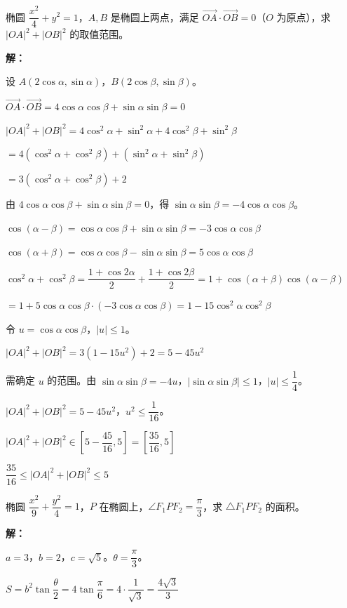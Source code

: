 \documentclass[12pt, a4paper]{ctexart}
\begin{document}
\begin{examplebox}[【例题8】向量条件转化]
椭圆 $\dfrac{x^2}{4}+y^2=1$，$A,B$ 是椭圆上两点，满足 $\overrightarrow{OA}\cdot\overrightarrow{OB}=0$（$O$ 为原点），求 $|OA|^2+|OB|^2$ 的取值范围。

\textbf{解：}

设 $A(2\cos\alpha,\sin\alpha)$，$B(2\cos\beta,\sin\beta)$。

$\overrightarrow{OA}\cdot\overrightarrow{OB}=4\cos\alpha\cos\beta+\sin\alpha\sin\beta=0$

$|OA|^2+|OB|^2=4\cos^2\alpha+\sin^2\alpha+4\cos^2\beta+\sin^2\beta$

$=4(\cos^2\alpha+\cos^2\beta)+(\sin^2\alpha+\sin^2\beta)$

$=3(\cos^2\alpha+\cos^2\beta)+2$

由 $4\cos\alpha\cos\beta+\sin\alpha\sin\beta=0$，得 $\sin\alpha\sin\beta=-4\cos\alpha\cos\beta$。

$\cos(\alpha-\beta)=\cos\alpha\cos\beta+\sin\alpha\sin\beta=-3\cos\alpha\cos\beta$

$\cos(\alpha+\beta)=\cos\alpha\cos\beta-\sin\alpha\sin\beta=5\cos\alpha\cos\beta$

$\cos^2\alpha+\cos^2\beta=\dfrac{1+\cos 2\alpha}{2}+\dfrac{1+\cos 2\beta}{2}=1+\cos(\alpha+\beta)\cos(\alpha-\beta)$

$=1+5\cos\alpha\cos\beta\cdot(-3\cos\alpha\cos\beta)=1-15\cos^2\alpha\cos^2\beta$

令 $u=\cos\alpha\cos\beta$，$|u|\leq 1$。

$|OA|^2+|OB|^2=3(1-15u^2)+2=5-45u^2$

需确定 $u$ 的范围。由 $\sin\alpha\sin\beta=-4u$，$|\sin\alpha\sin\beta|\leq 1$，$|u|\leq\dfrac{1}{4}$。

$|OA|^2+|OB|^2=5-45u^2$，$u^2\leq\dfrac{1}{16}$。

$|OA|^2+|OB|^2\in\left[5-\dfrac{45}{16}, 5\right]=\left[\dfrac{35}{16}, 5\right]$

$\boxed{\dfrac{35}{16}\leq |OA|^2+|OB|^2\leq 5}$
\end{examplebox}

\begin{examplebox}[【例题9】焦点三角形面积]
椭圆 $\dfrac{x^2}{9}+\dfrac{y^2}{4}=1$，$P$ 在椭圆上，$\angle F_1PF_2=\dfrac{\pi}{3}$，求 $\triangle F_1PF_2$ 的面积。

\textbf{解：}

$a=3$，$b=2$，$c=\sqrt{5}$。$\theta=\dfrac{\pi}{3}$。

$S=b^2\tan\dfrac{\theta}{2}=4\tan\dfrac{\pi}{6}=4\cdot\dfrac{1}{\sqrt{3}}=\boxed{\dfrac{4\sqrt{3}}{3}}$
\end{examplebox}
\end{document}
